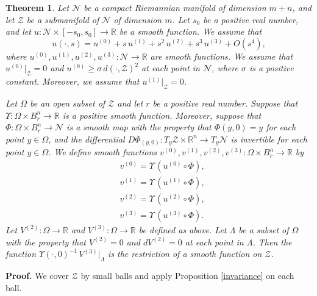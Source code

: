 \documentclass[11pt]{amsart}
\newtheorem{theorem}{Theorem}[section]
\theoremstyle{definition}
\begin{document}
\begin{theorem} 
\label{smooth.extension}
Let $\mathcal{N}$ be a compact Riemannian manifold of dimension $m+n$, and let $\mathcal{Z}$ be a submanifold of $\mathcal{N}$ of dimension $m$. Let $s_0$ be a positive real number, and let $u: \mathcal{N} \times [-s_0,s_0] \to \mathbb{R}$ be a smooth function. We assume that 
\[u(\cdot,s) = u^{(0)} + s \, u^{(1)} + s^2 \, u^{(2)} + s^3 \, u^{(3)} + O(s^4),\]
where $u^{(0)},u^{(1)},u^{(2)},u^{(3)}: \mathcal{N} \to \mathbb{R}$ are smooth functions. We assume that $u^{(0)}|_{\mathcal{Z}} = 0$ and $u^{(0)} \geq \sigma \, d(\cdot,\mathcal{Z})^2$ at each point in $\mathcal{N}$, where $\sigma$ is a positive constant. Moreover, we assume that $u^{(1)}|_{\mathcal{Z}} = 0$.

Let $\Omega$ be an open subset of $\mathcal{Z}$ and let $r$ be a positive real number. Suppose that $\Upsilon: \Omega \times B_r^n \to \mathbb{R}$ is a positive smooth function. Moreover, suppose that $\Phi: \Omega \times B_r^n \to \mathcal{N}$ is a smooth map with the property that $\Phi(y,0) = y$ for each point $y \in \Omega$, and the differential $D\Phi_{(y,0)}: T_y \mathcal{Z} \times \mathbb{R}^n \to T_y \mathcal{N}$ is invertible for each point $y \in \Omega$. We define smooth functions $v^{(0)},v^{(1)},v^{(2)},v^{(3)}: \Omega \times B_r^n \to \mathbb{R}$ by 
\begin{align*} 
&v^{(0)} = \Upsilon \, (u^{(0)} \circ \Phi), \\ 
&v^{(1)} = \Upsilon \, (u^{(1)} \circ \Phi), \\ 
&v^{(2)} = \Upsilon \, (u^{(2)} \circ \Phi), \\ 
&v^{(3)} = \Upsilon \, (u^{(3)} \circ \Phi). 
\end{align*} 
Let $V^{(2)}: \Omega \to \mathbb{R}$ and $V^{(3)}: \Omega \to \mathbb{R}$ be defined as above. Let $\Lambda$ be a subset of $\Omega$ with the property that $V^{(2)} = 0$ and $dV^{(2)} = 0$ at each point in $\Lambda$. Then the function $\Upsilon(\cdot,0)^{-1} \, V^{(3)}|_\Lambda$ is the restriction of a smooth function on $\mathcal{Z}$.
\end{theorem}

\textbf{Proof.} We cover $\mathcal{Z}$ by small balls and apply Proposition \ref{invariance} on each ball. \\
\end{document}
